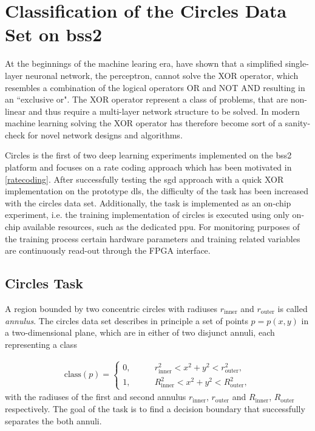 \chapter{Classification of the Circles Data Set on \acrshort{bss2}}
At the beginnings of the machine learing era, \cite{perceptron} have shown that a simplified single-layer neuronal network, the perceptron, cannot solve the XOR operator, which resembles a combination of the logical operators OR and NOT AND resulting in an ``exclusive or". The XOR operator represent a class of problems, that are non-linear and thus require a multi-layer network structure to be solved. In modern machine learning solving the XOR operator has therefore become sort of a sanity-check for novel network designs and algorithms.

Circles is the first of two deep learning experiments implemented on the \gls{bss2} platform and focuses on a rate coding approach which has been motivated in \cref{ratecoding}. After successfully testing the \acrlong{sgd} approach with a quick XOR implementation on the prototype \gls{dls}, the difficulty of the task has been increased with the circles data set. Additionally, the task is implemented as an on-chip experiment, i.e. the training implementation of circles is executed using only on-chip available resources, such as the dedicated \acrlong{ppu}. For monitoring purposes of the training process certain hardware parameters and training related variables are continuously read-out through the FPGA interface.





\section{Circles Task}
\label{circlestask}
A region bounded by two concentric circles with radiuses $r_{\text{inner}}$ and $r_{\text{outer}}$ is called \emph{annulus}. The circles data set describes in principle a set of points $p = p(x,y)$ in a two-dimensional plane, which are in either of two disjunct annuli, each representing a class 

\begin{align}
\text{class}(p) =
\begin{cases}
0 ,&\quad \quad r_{\text{inner}}^2 < x^2 + y^2 < r_{\text{outer}}^2, \\
1 ,&\quad \quad R_{\text{inner}}^2 < x^2 + y^2 < R_{\text{outer}}^2,
\end{cases}
\end{align}
with the radiuses of the first and second annulus $r_{\text{inner}}$, $r_{\text{outer}}$ and  $R_{\text{inner}}$, $R_{\text{outer}}$ respectively. The goal of the task is to find a decision boundary that successfully separates the both annuli.

